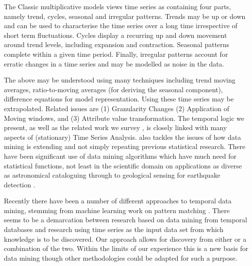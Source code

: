 The Classic multiplicative models views time series as containing four
parts, namely trend, cycles, seasonal and irregular patterns.
Trends may be up or down and can be used to characterise the time
series over a long time irrespective of short term fluctuations.
Cycles display a recurring up and down movement around trend levels,
including expansion and contraction. Seasonal patterns complete within
a given time period. Finally, irregular patterns account for erratic
changes in a time series and may be modelled as noise in the data.
\smallskip

The above may be understood using many techniques including trend moving averages, ratio-to-moving averages (for deriving
the seasonal component), difference equations for model
representation. Using these time series may be extrapolated.
Related issues are (1) Granularity Changes (2) Application of Moving
windows, and (3) Attribute value transformation. The temporal logic we
present, as well as the related work we survey
\cite{frm94,lai93,alss95,dgm97,dlm98}, is closely linked with many
aspects of (stationary) Time Series Analysis. \cite{gmp97} also
tackles the issues of how data mining is extending and not simply
repeating previous statistical research. There have been significant
use of data mining algorithms which have much need for statistical
functions, not least in the scientific domain on applications as
diverse as astronomical cataloguing through to geological sensing for
earthquake detection \cite{fhs96}.

\medskip

Recently there have been a number of different approaches to temporal
data mining, stemming from machine learning work on pattern
matching \cite{lai93,alss95}. There seems to be a demarcation between research based on
data mining from temporal databases and research using time series as
the input data set from which knowledge is to be discovered. Our
approach allows for discovery from either or a combination of the
two. Within the limits of our experience this is a new basis for data
mining though other methodologies could be
adapted for such a purpose.

\medskip

